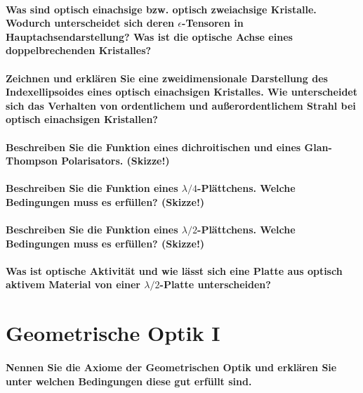 \documentclass[a4paper, 11pt, parskip=half]{scrartcl}
\begin{document}
\paragraph{Was sind optisch einachsige bzw. optisch zweiachsige Kristalle. Wodurch unterscheidet
sich deren $\epsilon$-Tensoren in Hauptachsendarstellung? Was ist die optische Achse eines
doppelbrechenden Kristalles?}

\paragraph{Zeichnen und erklären Sie eine zweidimensionale Darstellung des Indexellipsoides eines
optisch einachsigen Kristalles. Wie unterscheidet sich das Verhalten von ordentlichem und
außerordentlichem Strahl bei optisch einachsigen Kristallen?}

\paragraph{Beschreiben Sie die Funktion eines dichroitischen und eines Glan-Thompson Polarisators.
(Skizze!)}

\paragraph{Beschreiben Sie die Funktion eines $\lambda/4$-Plättchens. Welche Bedingungen muss es
erfüllen? (Skizze!)}

\paragraph{Beschreiben Sie die Funktion eines $\lambda/2$-Plättchens. Welche Bedingungen muss es
erfüllen? (Skizze!)}

\paragraph{Was ist optische Aktivität und wie lässt sich eine Platte aus optisch aktivem Material
von einer $\lambda/2$-Platte unterscheiden?}

\newpage

\section{Geometrische Optik I}


\paragraph{Nennen Sie die Axiome der Geometrischen Optik und erklären Sie unter welchen Bedingungen
diese gut erfüllt sind.}
\end{document}
